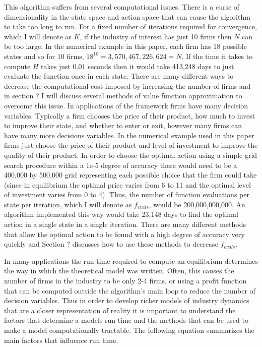 \documentclass[12pt]{article}
\begin{document}
This algorithm suffers from several computational issues. There is a curse of dimensionality in the state space and action space that can cause the algorithm to take too long to run. For a fixed number of iterations required for convergence, which I will denote as $K$, if the industry of interest has just 10 firms then $N$ can be too large. In the numerical example in this paper, each firm has 18 possible states and so for 10 firms, $18^{10}=3,570,467,226,624=N$. If the time it takes to compute $H$ takes just 0.01 seconds then it would take 413,248 days to just evaluate the function once in each state. There are many different ways to decrease the computational cost imposed by increasing the number of firms and in section ? I will discuss several methods of value function approximation to overcome this issue. In applications of the \citet{1995_Erickson_Pakes_RES} framework firms have many decision variables. Typically a firm chooses the price of their product, how much to invest to improve their state, and whether to enter or exit, however many firms can have many more decisions variables. In the numerical example used in this paper firms just choose the price of their product and level of investment to improve the quality of their product. In order to choose the optimal action using a simple grid search procedure within a 1e-5 degree of accuracy there would need to be a 400,000 by 500,000 grid representing each possible choice that the firm could take (since in equilibrium the optimal price varies from 6 to 11 and the optimal level of investment varies from 0 to 4). Thus, the number of function evaluations per state per iteration, which I will denote as $f_{evals}$, would be 200,000,000,000. An algorithm implemented this way would take 23,148 days to find the optimal action in a single state in a single iteration. There are many different methods that allow the optimal action to be found with a high degree of accuracy very quickly and Section ? discusses how to use these methods to decrease $f_{evals}$.

In many applications the run time required to compute an equilibrium determines the way in which the theoretical model was written. Often, this causes the number of firms in the industry to be only 2-4 firms, or using a profit function that can be computed outside the algorithm's main loop to reduce the number of decision variables. %
Thus in order to develop richer models of industry dynamics that are a closer representation of reality it is important to understand the factors that determine a models run time and the methods that can be used to make a model computationally tractable. The following equation summarizes the main factors that influence run time.
\end{document}

